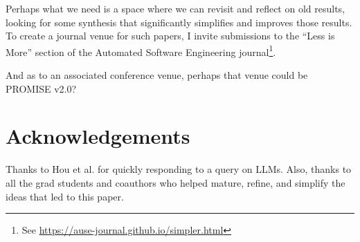 \documentclass[sigconf,screen]{acmart}
\begin{document}
Perhaps what we need is a space where we can revisit and reflect on old results, looking for some synthesis that significantly simplifies and improves those results.
To create a journal venue for such papers, I invite submissions to the ``Less is More''   section of the Automated Software Engineering journal\footnote{See \url{https://ause-journal.github.io/simpler.html}}.

And as to an associated conference venue, perhaps that venue   could be PROMISE v2.0?


\section*{Acknowledgements}
Thanks to Hou et al. for quickly responding to a query
on LLMs. Also, thanks to all   the
grad students and coauthors who helped mature, refine, and simplify the ideas
that led to this paper.   






\end{document}
